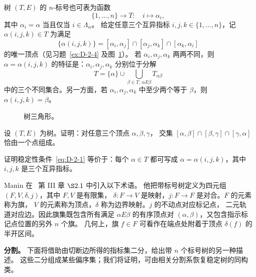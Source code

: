 树 $(T,E)$ 的 $n$-标号也可表为函数
\[
  \{1,\ldots,n\}\longrightarrow T:\quad i\longmapsto\alpha_i,
\]
其中 $\alpha_i=\alpha$ 当且仅当 $i\in\Lambda_\alpha$。
给定任意三个互异指标 $i,j,k\in\{1,\ldots,n\}$，记
$\alpha(i,j,k)\in T$ 为满足
\begin{equation}\label{eq:D-2-2}
  \{\alpha(i,j,k)\}
   =[\alpha_i,\alpha_j]\cap[\alpha_j,\alpha_k]
       \cap[\alpha_k,\alpha_i]
\end{equation}
的唯一顶点（见习题~\ref{ex:D-2-4} 及图~\ref{fig:D-2-2}）。
若 $\alpha_i,\alpha_j,\alpha_k$ 两两不同，则 $\alpha=\alpha(i,j,k)$
的特征是：$\alpha_i,\alpha_j,\alpha_k$ 分别位于分解
\[
  T=\{\alpha\}\cup\bigcup_{\beta\in T,\,\alpha E\beta}T_{\alpha\beta}
\]
中的三个不同集合。另一方面，若 $\alpha_i,\alpha_j,\alpha_k$
中至少两个等于 $\beta$，则 $\alpha(i,j,k)=\beta$。

\begin{figure}[tbp]
\centering

\caption{树三角形。}\label{fig:D-2-2}
\end{figure}

\begin{exercise}\label{ex:D-2-4}
设 $(T,E)$ 为树。证明：对任意三个顶点 $\alpha,\beta,\gamma$，
交集 $[\alpha,\beta]\cap[\beta,\gamma]\cap[\gamma,\alpha]$
恰由一个点组成。
\end{exercise}

\begin{exercise}\label{ex:D-2-5}
证明稳定性条件~\eqref{eq:D-2-1} 等价于：每个 $\alpha\in T$
都可写成 $\alpha=\alpha(i,j,k)$，其中 $i,j,k$ 是三个互异指标。
\end{exercise}

Manin 在~ 第 III 章 $\S2.1$ 中引入以下术语。
他把带标号树定义为四元组 $(F,V,\delta,j)$，其中 $F,V$ 是有限集，
$\delta:F\to V$ 是映射，$j:F\to F$ 是对合。$F$ 的元素称为旗，
$V$ 的元素称为顶点，$\delta$ 称为边界映射。$j$ 的不动点对应标记点，
二元轨道对应边。因此旗集既包含所有满足 $\alpha E\beta$ 的有序顶点对
$(\alpha,\beta)$，又包含指示标记点位置的另外 $n$ 个旗。
几何上，旗 $f\in F$ 可看作在端点处附着于顶点 $\delta(f)$ 的半开区间。

\noindent\textbf{分割。}
下面将借助由切断边所得的指标集二分，给出带 $n$ 个标号树的另一种描述。
这些二分组成某些偏序集；我们将证明，可由相关分割系恢复稳定树的同构类。

